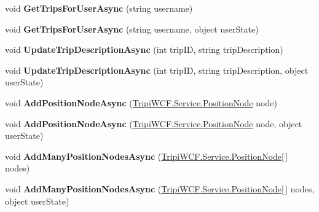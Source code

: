 \begin{DoxyCompactItemize}
\item 
\hypertarget{class_trip_service_client_abf37a65ba72504c498cb9dce2f0f91c7}{
void {\bfseries GetTripsForUserAsync} (string username)}
\label{class_trip_service_client_abf37a65ba72504c498cb9dce2f0f91c7}

\item 
\hypertarget{class_trip_service_client_abdaa0d093a9662740585b7e61db6633a}{
void {\bfseries GetTripsForUserAsync} (string username, object userState)}
\label{class_trip_service_client_abdaa0d093a9662740585b7e61db6633a}

\item 
\hypertarget{class_trip_service_client_a240fe3d84c330dd69a7739704a687ac6}{
void {\bfseries UpdateTripDescriptionAsync} (int tripID, string tripDescription)}
\label{class_trip_service_client_a240fe3d84c330dd69a7739704a687ac6}

\item 
\hypertarget{class_trip_service_client_adc7cca208029a5a744ceac9bf5046e19}{
void {\bfseries UpdateTripDescriptionAsync} (int tripID, string tripDescription, object userState)}
\label{class_trip_service_client_adc7cca208029a5a744ceac9bf5046e19}

\item 
\hypertarget{class_trip_service_client_a2f46a97c1e1e43c6aaa2dd1087fb59f3}{
void {\bfseries AddPositionNodeAsync} (\hyperlink{class_tripi_w_c_f_1_1_service_1_1_position_node}{TripiWCF.Service.PositionNode} node)}
\label{class_trip_service_client_a2f46a97c1e1e43c6aaa2dd1087fb59f3}

\item 
\hypertarget{class_trip_service_client_a96846c11d938c1877149a2334bb2d901}{
void {\bfseries AddPositionNodeAsync} (\hyperlink{class_tripi_w_c_f_1_1_service_1_1_position_node}{TripiWCF.Service.PositionNode} node, object userState)}
\label{class_trip_service_client_a96846c11d938c1877149a2334bb2d901}

\item 
\hypertarget{class_trip_service_client_a3af0c86e31fad01e277ea39904293c66}{
void {\bfseries AddManyPositionNodesAsync} (\hyperlink{class_tripi_w_c_f_1_1_service_1_1_position_node}{TripiWCF.Service.PositionNode}\mbox{[}$\,$\mbox{]} nodes)}
\label{class_trip_service_client_a3af0c86e31fad01e277ea39904293c66}

\item 
\hypertarget{class_trip_service_client_a147922917a913388759724c9c4a0ff5f}{
void {\bfseries AddManyPositionNodesAsync} (\hyperlink{class_tripi_w_c_f_1_1_service_1_1_position_node}{TripiWCF.Service.PositionNode}\mbox{[}$\,$\mbox{]} nodes, object userState)}
\label{class_trip_service_client_a147922917a913388759724c9c4a0ff5f}


\end{DoxyCompactItemize}
